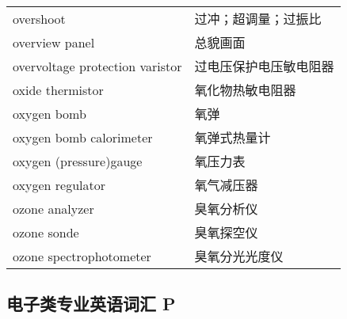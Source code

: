 \documentclass[
]{article}
\begin{document}
\begin{longtable}[]{@{}ll@{}}
overshoot & 过冲；超调量；过振比 \\
overview panel & 总貌画面 \\
overvoltage protection varistor & 过电压保护电压敏电阻器 \\
oxide thermistor & 氧化物热敏电阻器 \\
oxygen bomb & 氧弹 \\
oxygen bomb calorimeter & 氧弹式热量计 \\
oxygen (pressure)gauge & 氧压力表 \\
oxygen regulator & 氧气减压器 \\
ozone analyzer & 臭氧分析仪 \\
ozone sonde & 臭氧探空仪 \\
ozone spectrophotometer & 臭氧分光光度仪 \\
\bottomrule()
\end{longtable}

\hypertarget{ux7535ux5b50ux7c7bux4e13ux4e1aux82f1ux8bedux8bcdux6c47-p}{%
\subsection{\texorpdfstring{电子类专业英语词汇 P
}{电子类专业英语词汇 P }}\label{ux7535ux5b50ux7c7bux4e13ux4e1aux82f1ux8bedux8bcdux6c47-p}}
\end{document}

